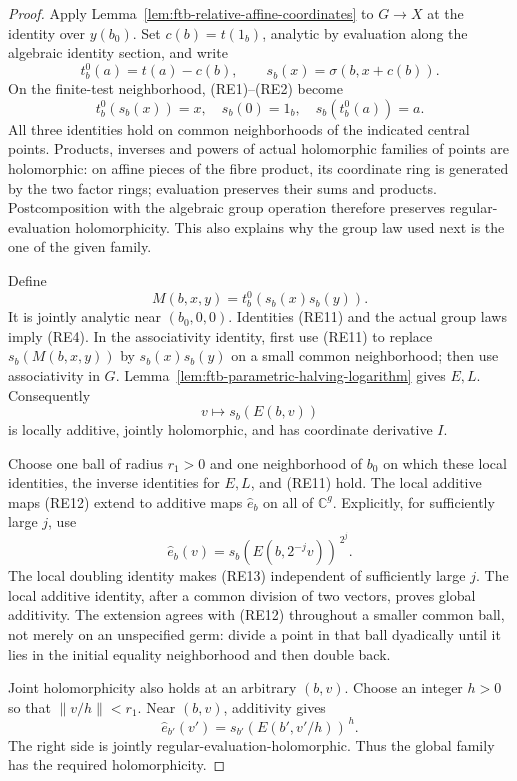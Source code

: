 \begin{proof}
Apply Lemma~\ref{lem:ftb-relative-affine-coordinates}
to \(G\to X\) at the identity over \(y(b_0)\).
Set \(c(b)=t(1_b)\), analytic by evaluation along the
algebraic identity section, and write
\[
                 t_b^0(a)=t(a)-c(b),\qquad
                 s_b(x)=\sigma(b,x+c(b)).
\]
On the finite-test neighborhood, (RE1)--(RE2) become
\[
          t_b^0(s_b(x))=x,\quad s_b(0)=1_b,\quad
                         s_b(t_b^0(a))=a.                 \tag{RE11}
\]
All three identities hold on common neighborhoods of
the indicated central points.
Products, inverses and powers of actual holomorphic
families of points are holomorphic:
on affine pieces of the fibre product, its coordinate
ring is generated by the two factor rings;
evaluation preserves their sums and products.
Postcomposition with the algebraic group operation
therefore preserves regular-evaluation holomorphicity.
This also explains why the group law used next is the
one of the given family.

Define
\[
                   M(b,x,y)=t_b^0(s_b(x)s_b(y)).
\]
It is jointly analytic near \((b_0,0,0)\).
Identities (RE11) and the actual group laws imply (RE4).
In the associativity identity, first use (RE11) to
replace \(s_b(M(b,x,y))\) by \(s_b(x)s_b(y)\)
on a small common neighborhood; then use associativity
in \(G\).
Lemma~\ref{lem:ftb-parametric-halving-logarithm} gives \(E,L\).
Consequently
\[
                         v\longmapsto s_b(E(b,v))           \tag{RE12}
\]
is locally additive, jointly holomorphic, and has
coordinate derivative \(I\).

Choose one ball of radius \(r_1>0\) and one neighborhood
of \(b_0\) on which these local identities, the inverse
identities for \(E,L\), and (RE11) hold.
The local additive maps (RE12) extend to additive maps
\(\widehat e_b\) on all of \(\mathbb C^g\).
Explicitly, for sufficiently large \(j\), use
\[
           \widehat e_b(v)=
                  s_b(E(b,2^{-j}v))^{\,2^j}.               \tag{RE13}
\]
The local doubling identity makes (RE13) independent
of sufficiently large \(j\).
The local additive identity, after a common division
of two vectors, proves global additivity.
The extension agrees with (RE12) throughout a smaller
common ball, not merely on an unspecified germ:
divide a point in that ball dyadically until it lies in
the initial equality neighborhood and then double back.

Joint holomorphicity also holds at an arbitrary \((b,v)\).
Choose an integer \(h>0\) so that \(\|v/h\|<r_1\).
Near \((b,v)\), additivity gives
\[
                   \widehat e_{b'}(v')=
                            s_{b'}(E(b',v'/h))^{\,h}.
\]
The right side is jointly regular-evaluation-holomorphic.
Thus the global family has the required holomorphicity.


\end{proof}
